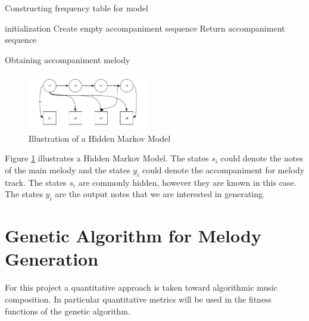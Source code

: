 \begin{algorithm}
 \caption{Constructing frequency table for model}
\end{algorithm}

\begin{algorithm}
 initialization\;
 Create empty accompaniment sequence\;
 Return accompaniment sequence\;
 \caption{Obtaining accompaniment melody}
\end{algorithm}


\begin{figure}
\centerline{\includegraphics[width=200px]{../images/hmm_illu.pdf}}
\caption{Illustration of a Hidden Markov Model}
\label{ims:hmm_illu}
\end{figure}

Figure \ref{ims:hmm_illu} illustrates a Hidden Markov Model. The states $s_i$ could denote the notes of the main melody and the states $y_i$ could denote the accompaniment for melody track. The states $s_i$ are commonly hidden, however they are known in this case. The states $y_i$ are the output notes that we are interested in generating.


\chapter{Genetic Algorithm for Melody Generation}

For this project a quantitative approach is taken toward algorithmic music composition. In particular quantitative metrics will be used in the fitness functions of the genetic algorithm.


